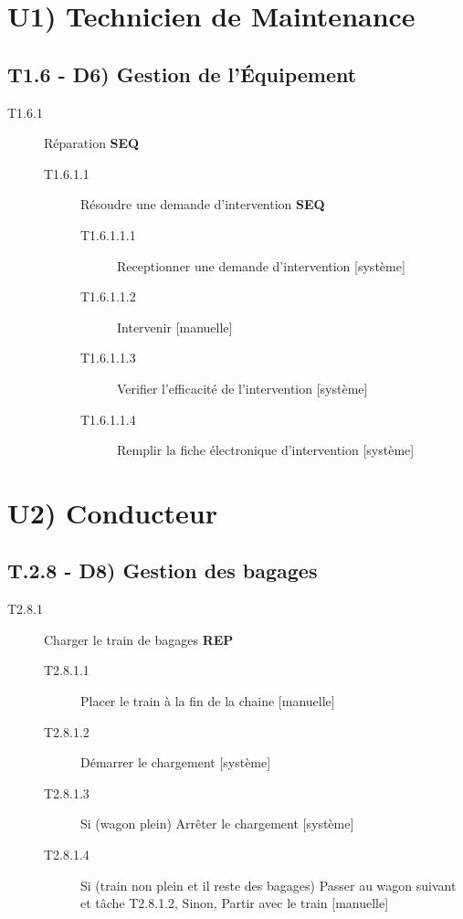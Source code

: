 \section*{U1) Technicien de Maintenance}
	\subsection*{T1.6 - D6) Gestion de l'Équipement}
	\begin{description}
		\item[T1.6.1] Réparation \textbf{SEQ}
		\begin{description}
			\item[T1.6.1.1] Résoudre une demande d'intervention \textbf{SEQ}
			\begin{description}
				\item[T1.6.1.1.1] Receptionner une demande d'intervention [système]
				\item[T1.6.1.1.2] Intervenir [manuelle]
				\item[T1.6.1.1.3] Verifier l'efficacité de l'intervention [système]
				\item[T1.6.1.1.4] Remplir la fiche électronique d'intervention [système]
			\end{description}
		\end{description}
	\end{description}

\section*{U2) Conducteur}
	\subsection*{T.2.8 - D8) Gestion des bagages}
	\begin{description}
		\item[T2.8.1] Charger le train de bagages \textbf{REP}
		\begin{description}
			\item[T2.8.1.1] Placer le train à la fin de la chaine [manuelle]
			\item[T2.8.1.2] Démarrer le chargement [système]
			\item[T2.8.1.3] Si (wagon plein) Arrêter le chargement [système]
			\item[T2.8.1.4] Si (train non plein et il reste des bagages) Passer au wagon suivant et tâche T2.8.1.2, Sinon, Partir avec le train [manuelle]
		\end{description}
	\end{description}
	

